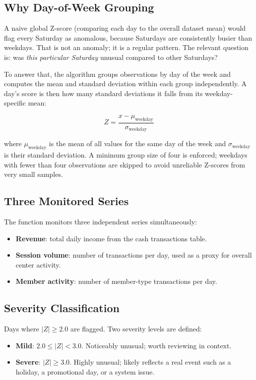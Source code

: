 \documentclass[12pt, a4paper]{report}
\begin{document}
\subsection{Why Day-of-Week Grouping}

A naive global Z-score (comparing each day to the overall dataset mean) would flag
every Saturday as anomalous, because Saturdays are consistently busier than
weekdays. That is not an anomaly; it is a regular pattern. The relevant question
is: was \textit{this particular Saturday} unusual compared to other Saturdays?

To answer that, the algorithm groups observations by day of the week and computes
the mean and standard deviation within each group independently. A day's score is
then how many standard deviations it falls from its weekday-specific mean:

\[
  Z = \frac{x - \mu_{\text{weekday}}}{\sigma_{\text{weekday}}}
\]

where $\mu_{\text{weekday}}$ is the mean of all values for the same day of the
week and $\sigma_{\text{weekday}}$ is their standard deviation. A minimum group
size of four is enforced; weekdays with fewer than four observations are skipped
to avoid unreliable Z-scores from very small samples.

\subsection{Three Monitored Series}

The function monitors three independent series simultaneously:

\begin{itemize}
  \item \textbf{Revenue}: total daily income from the cash transactions table.
  \item \textbf{Session volume}: number of transactions per day, used as a proxy
        for overall center activity.
  \item \textbf{Member activity}: number of member-type transactions per day.
\end{itemize}

\subsection{Severity Classification}

Days where $|Z| \geq 2.0$ are flagged. Two severity levels are defined:

\begin{itemize}
  \item \textbf{Mild}: $2.0 \leq |Z| < 3.0$. Noticeably unusual; worth reviewing
        in context.
  \item \textbf{Severe}: $|Z| \geq 3.0$. Highly unusual; likely reflects a real
        event such as a holiday, a promotional day, or a system issue.
\end{itemize}
\end{document}
